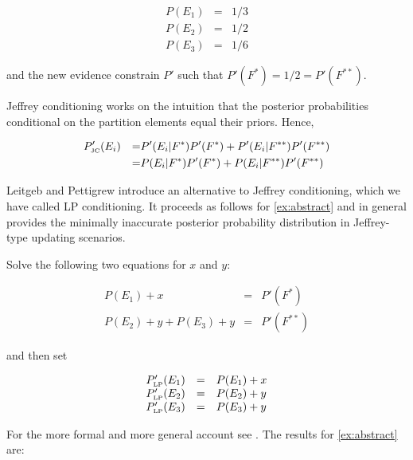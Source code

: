 \documentclass[11pt]{article}
\begin{document}
\begin{equation}
  \label{eq:priors}
  \begin{array}{rcl}
    P(E_{1})&=&1/3 \\
    P(E_{2})&=&1/2 \\
    P(E_{3})&=&1/6
  \end{array}
\end{equation}

and the new evidence constrain $P'$ such that
$P'(F^{*})=1/2=P'(F^{**})$.

Jeffrey conditioning works on the intuition that the posterior
probabilities conditional on the partition elements equal their
priors. Hence,

\begin{align}
  \label{eq:jc}
  &P'_{\mbox{\tiny JC}}(E_{i})&=&P'(E_{i}|F^{*})P'(F^{*})+P'(E_{i}|F^{**})P'(F^{**})\notag \\
  &&=&P(E_{i}|F^{*})P'(F^{*})+P(E_{i}|F^{**})P'(F^{**})
\end{align}

Leitgeb and Pettigrew introduce an alternative to Jeffrey
conditioning, which we have called LP conditioning. It proceeds as
follows for {\xample} \ref{ex:abstract} and in general provides the
minimally inaccurate posterior probability distribution in
Jeffrey-type updating scenarios.

Solve the following two equations for $x$ and $y$:

\begin{equation}
  \label{eq:lpce}
  \begin{array}{rcl}
    P(E_{1})+x&=&P'(F^{*}) \\
    P(E_{2})+y+P(E_{3})+y&=&P'(F^{**})
  \end{array}
\end{equation}

and then set

\begin{equation}
  \label{eq:lpcf}
  \begin{array}{rcl}
    P'_{\mbox{\tiny LP}}(E_{1})&=&P(E_{1})+x \\
    P'_{\mbox{\tiny LP}}(E_{2})&=&P(E_{2})+y \\
    P'_{\mbox{\tiny LP}}(E_{3})&=&P(E_{3})+y
  \end{array}
\end{equation}

For the more formal and more general account see
. The results for {\xample}
\ref{ex:abstract} are:
\end{document}

